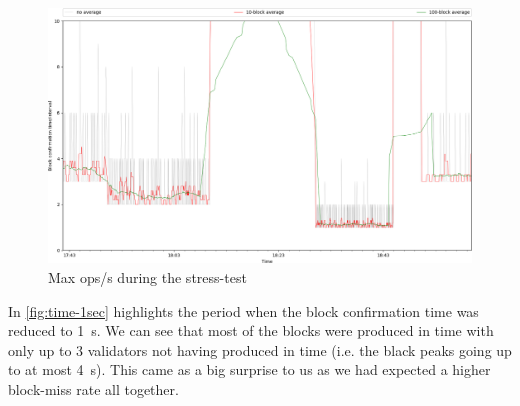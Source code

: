 \begin{figure}[!htp]
 \centering
 \includegraphics[width=\linewidth]{figures/stress-test-block-time-1sec.png}
 \caption{Max ops/s during the stress-test}
 \label{fig:time-1se}
\end{figure}

In \cref{fig:time-1sec} highlights the period when the block confirmation time was reduced to \SI{1}{s}. We can see that most of the blocks were produced in time with only up to 3 validators not having produced in time
(i.e. the black peaks going up to at most \SI{4}{s}). This came as a big
surprise to us as we had expected a higher block-miss rate all together.
